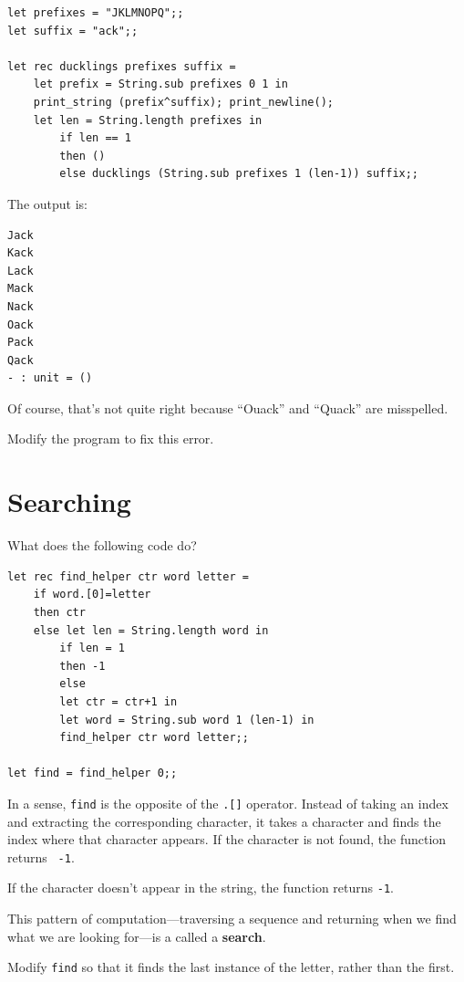 \documentclass[10pt]{book}
\begin{document}
\beforeverb
\begin{verbatim}
let prefixes = "JKLMNOPQ";;
let suffix = "ack";;

let rec ducklings prefixes suffix = 
	let prefix = String.sub prefixes 0 1 in
	print_string (prefix^suffix); print_newline();
	let len = String.length prefixes in
		if len == 1
		then ()
		else ducklings (String.sub prefixes 1 (len-1)) suffix;;
\end{verbatim}
\afterverb
%
The output is:

\beforeverb
\begin{verbatim}
Jack
Kack
Lack
Mack
Nack
Oack
Pack
Qack
- : unit = ()
\end{verbatim}
\afterverb
%
Of course, that's not quite right because ``Ouack'' and
``Quack'' are misspelled.

\begin{ex}
Modify the program to fix this error.
\end{ex}

\section{Searching}
\label{find}

What does the following code do?


\beforeverb
\begin{verbatim}
let rec find_helper ctr word letter = 
	if word.[0]=letter
	then ctr
	else let len = String.length word in
		if len = 1
		then -1
		else
		let ctr = ctr+1 in
		let word = String.sub word 1 (len-1) in
		find_helper ctr word letter;;

let find = find_helper 0;;
\end{verbatim}
\afterverb
%
In a sense, {\tt find} is the opposite of the {\tt .[]} operator.
Instead of taking an index and extracting the corresponding character,
it takes a character and finds the index where that character
appears.  If the character is not found, the function returns {\tt
-1}.

If the character doesn't appear in the string, the function returns 
{\tt -1}.

This pattern of computation---traversing a sequence and returning
when we find what we are looking for---is a called a {\bf search}.


\begin{ex}
Modify {\tt find} so that it finds the last
instance of the letter, rather than the first.
\end{ex}
\end{document}
